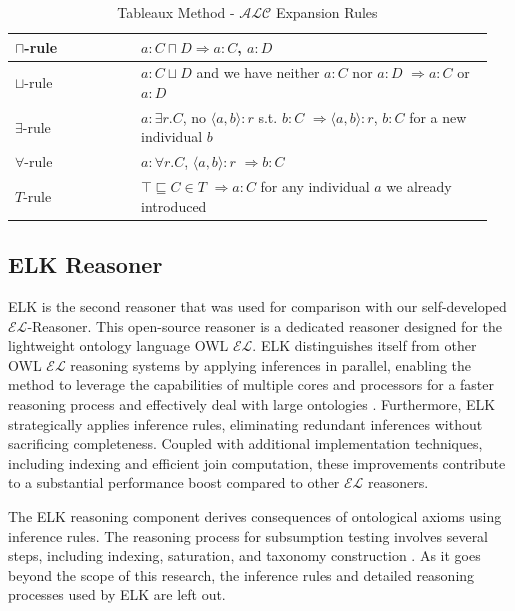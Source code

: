 \documentclass[a4paper]{article}
\theoremstyle{plain}
\theoremstyle{definition}
\begin{document}
\begin{table}[h]
  \centering
  \caption{Tableaux Method - $\mathcal{ALC}$ Expansion Rules}
  \begin{tabular}{|>{\raggedright\arraybackslash}p{0.25\linewidth}|p{0.7\linewidth}|}
    \hline
    $\sqcap$-rule & $a : C \sqcap D \Rightarrow a : C$, $a : D$ \\
    \hline
    $\sqcup$-rule & $a : C \sqcup D$ and we have neither $a : C$ nor $a : D$ $\Rightarrow a : C$ or $a : D$ \\
    \hline
    $\exists$-rule & $a : \exists r.C$, no $\langle a, b \rangle : r$ s.t. $b : C$ $\Rightarrow \langle a, b \rangle : r$, $b : C$ for a new individual $b$ \\
    \hline
    $\forall$-rule & $a : \forall r.C$, $\langle a, b \rangle : r$ $\Rightarrow b : C$ \\
    \hline
    $T$-rule & $\top \sqsubseteq C \in T$ $\Rightarrow a : C$ for any individual $a$ we already introduced \\
    \hline
  \end{tabular}
  \label{TableauxRules}
\end{table}

    \subsection{ELK Reasoner}
    ELK is the second reasoner that was used for comparison with our self-developed $\mathcal{EL}$-Reasoner. This open-source reasoner is a dedicated reasoner designed for the lightweight ontology language OWL $\mathcal{EL}$. ELK distinguishes itself from other OWL $\mathcal{EL}$ reasoning systems by applying inferences in parallel, enabling the method to leverage the capabilities of multiple cores and processors for a faster reasoning process and effectively deal with large ontologies \cite{kazakov}. Furthermore, ELK strategically applies inference rules, eliminating redundant inferences without sacrificing completeness. Coupled with additional implementation techniques, including indexing and efficient join computation, these improvements contribute to a substantial performance boost compared to other $\mathcal{EL}$ reasoners.

    The ELK reasoning component derives consequences of ontological axioms using inference rules. The reasoning process for subsumption testing involves several steps, including indexing, saturation, and taxonomy construction \cite{kazakov}. As it goes beyond the scope of this research, the inference rules and detailed reasoning processes used by ELK are left out.
          
\end{document}
